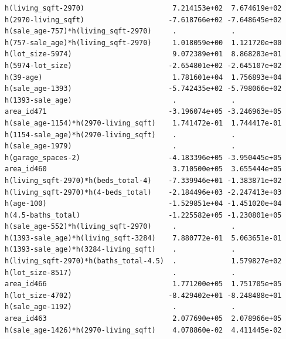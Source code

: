 \documentclass[
]{article}
\begin{document}
\begin{verbatim}
h(living_sqft-2970)                     7.214153e+02  7.674619e+02
h(2970-living_sqft)                    -7.618766e+02 -7.648645e+02
h(sale_age-757)*h(living_sqft-2970)     .             .           
h(757-sale_age)*h(living_sqft-2970)     1.018059e+00  1.121720e+00
h(lot_size-5974)                        9.072389e+01  8.868283e+01
h(5974-lot_size)                       -2.654801e+02 -2.645107e+02
h(39-age)                               1.781601e+04  1.756893e+04
h(sale_age-1393)                       -5.742435e+02 -5.798066e+02
h(1393-sale_age)                        .             .           
area_id471                             -3.196074e+05 -3.246963e+05
h(sale_age-1154)*h(2970-living_sqft)    1.741472e-01  1.744417e-01
h(1154-sale_age)*h(2970-living_sqft)    .             .           
h(sale_age-1979)                        .             .           
h(garage_spaces-2)                     -4.183396e+05 -3.950445e+05
area_id460                              3.710500e+05  3.655444e+05
h(living_sqft-2970)*h(beds_total-4)    -7.339946e+01 -1.383871e+02
h(living_sqft-2970)*h(4-beds_total)    -2.184496e+03 -2.247413e+03
h(age-100)                             -1.529851e+04 -1.451020e+04
h(4.5-baths_total)                     -1.225582e+05 -1.230801e+05
h(sale_age-552)*h(living_sqft-2970)     .             .           
h(1393-sale_age)*h(living_sqft-3284)    7.880772e-01  5.063651e-01
h(1393-sale_age)*h(3284-living_sqft)    .             .           
h(living_sqft-2970)*h(baths_total-4.5)  .             1.579827e+02
h(lot_size-8517)                        .             .           
area_id466                              1.771200e+05  1.751705e+05
h(lot_size-4702)                       -8.429402e+01 -8.248488e+01
h(sale_age-1192)                        .             .           
area_id463                              2.077690e+05  2.078966e+05
h(sale_age-1426)*h(2970-living_sqft)    4.078860e-02  4.411445e-02
                                                                  

\end{verbatim}
\end{document}
